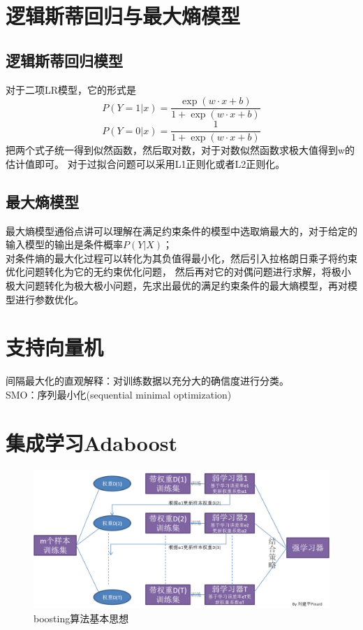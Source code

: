 \documentclass[UTF8]{article}%
\begin{document}
	\section{逻辑斯蒂回归与最大熵模型}
	\subsection{逻辑斯蒂回归模型}
	对于二项LR模型，它的形式是
	$$P(Y=1|x)=\frac{\exp(w \cdot x+b)}{1+\exp(w \cdot x+b)}$$
	$$P(Y=0|x)=\frac{1}{1+\exp(w \cdot x+b)}$$
	把两个式子统一得到似然函数，然后取对数，对于对数似然函数求极大值得到w的估计值即可。
	对于过拟合问题可以采用L1正则化或者L2正则化。
	\subsection{最大熵模型}
	最大熵模型通俗点讲可以理解在满足约束条件的模型中选取熵最大的，对于给定的输入模型的输出是条件概率$P(Y|X)$；\\
	对条件熵的最大化过程可以转化为其负值得最小化，然后引入拉格朗日乘子将约束优化问题转化为它的无约束优化问题，
	然后再对它的对偶问题进行求解，将极小极大问题转化为极大极小问题，先求出最优的满足约束条件的最大熵模型，再对模型进行参数优化。
	\newpage
	\section{支持向量机}
	间隔最大化的直观解释：对训练数据以充分大的确信度进行分类。\\
	SMO：序列最小化(sequential minimal optimization)
	
	\newpage
	\section{集成学习Adaboost}
	\begin{figure}[h]%
		\centering  %
		\includegraphics[width=1.0\linewidth]{figures/adaboost}  %
		\caption{boosting算法基本思想}  %
		\label{boosting}   %
	\end{figure}
\end{document}
